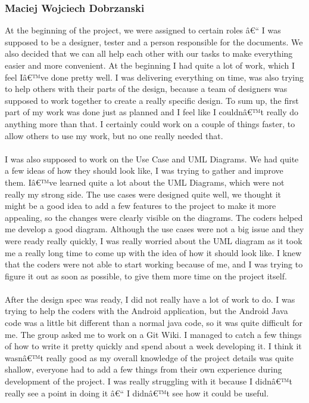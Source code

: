 \documentclass[12pt]{article}
\begin{document}
\subsubsection{Maciej Wojciech Dobrzanski}
At the beginning of the project, we were assigned to certain roles â€“ I was supposed to be a designer, tester and a person responsible for the documents. We also decided that we can all help each other with our tasks to make everything easier and more convenient. At the beginning I had quite a lot of work, which I feel Iâ€™ve done pretty well. I was delivering everything on time, was also trying to help others with their parts of the design, because a team of designers was supposed to work together to create a really specific design. To sum up, the first part of my work was done just as planned and I feel like I couldnâ€™t really do anything more than that. I certainly could work on a couple of things faster, to allow others to use my work, but no one really needed that. 
~\\\\
 I was also supposed to work on the Use Case and UML Diagrams. We had quite a few ideas of how they should look like, I was trying to gather and improve them. Iâ€™ve learned quite a lot about the UML Diagrams, which were not really my strong side. The use cases were designed quite well, we thought it might be a good idea to add a few features to the project to make it more appealing, so the changes were clearly visible on the diagrams. The coders helped me develop a good diagram. Although the use cases were not a big issue and they were ready really quickly, I was really worried about the UML diagram as it took me a really long time to come up with the idea of how it should look like. I knew that the coders were not able to start working because of me, and I was trying to figure it out as soon as possible, to give them more time on the project itself. 
~\\\\
After the design spec was ready, I did not really have a lot of work to do. I was trying to help the coders with the Android application, but the Android Java code was a little bit different than a normal java code, so it was quite difficult for me. The group asked me to work on a Git Wiki. I managed to catch a few things of how to write it pretty quickly and spend about a week developing it. I think it wasnâ€™t really good as my overall knowledge of the project details was quite shallow, everyone had to add a few things from their own experience during development of the project. I was really struggling with it because I didnâ€™t really see a point in doing it â€“ I didnâ€™t see how it could be useful.
\end{document}
